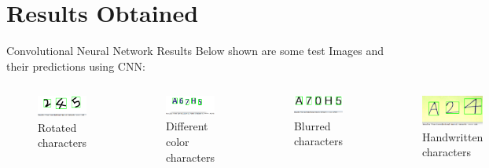 \documentclass[10pt, a4paper]{beamer}
\begin{document}
\section{Results Obtained}
\begin{frame}{Convolutional Neural Network Results}
Below shown are some test Images and their predictions using CNN:
\begin{columns}

\begin{figure}
 \includegraphics[height=0.26 \textheight]{test245.png}
 \caption{Rotated characters}
\end{figure}
\begin{figure}
 \includegraphics[height=0.26 \textheight]{testA67H5_color.png}
 \caption{Different color characters}
\end{figure}
\begin{figure}
 \includegraphics[height=0.25 \textheight]{testA70H5_blur.png}
 \caption{Blurred characters}
\end{figure}
\begin{figure}
 \includegraphics[height=0.27 \textheight]{testA24.png}
 \caption{Handwritten characters}
\end{figure}
\end{columns}
\end{frame}
\end{document}
